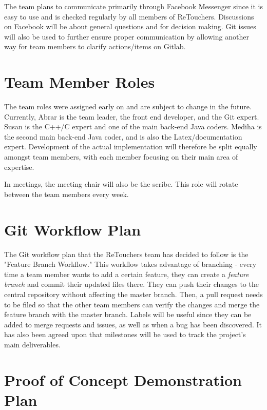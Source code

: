 \documentclass{article}
\begin{document}
	The team plans to communicate primarily through Facebook Messenger since it is easy to use and is checked regularly by all members of ReTouchers. Discussions on Facebook will be about general questions and for decision making. Git issues will also be used to further ensure proper communication by allowing another way for team members to clarify actions/items on Gitlab. 

\section{Team Member Roles}

	The team roles were assigned early on and are subject to change in the future. Currently, Abrar is the team leader, the front end developer, and the Git expert. Susan is the C++/C expert and one of the main back-end Java coders. Mediha is the second main back-end Java coder, and is also the Latex/documentation expert. Development of the actual implementation will therefore be split equally amongst team members, with each member focusing on their main area of expertise.

	In meetings, the meeting chair will also be the scribe. This role will rotate between the team members every week.

\section{Git Workflow Plan}

	The Git workflow plan that the ReTouchers team has decided to follow is the "Feature Branch Workflow." This workflow takes advantage of branching - every time a team member wants to add a 
certain feature, they can create a\textit{ feature branch} and commit their updated files there. They can push their changes to the central repository without affecting the master branch. Then, a pull request needs to be filed so that the other team members can verify the changes and merge the feature branch with the master branch. Labels will be useful since they can be added to merge requests and issues, as well as when a bug has been discovered. It has also been agreed upon that milestones will be used to track the project's main deliverables.

\section{Proof of Concept Demonstration Plan}
\end{document}
